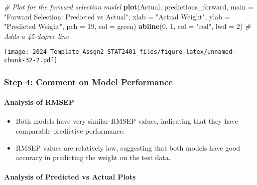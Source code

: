 \documentclass[
]{article}
\newenvironment{Shaded}{\begin{snugshade}}{\end{snugshade}}
\newcommand{\AttributeTok}[1]{\textcolor[rgb]{0.13,0.29,0.53}{#1}}
\newcommand{\CommentTok}[1]{\textcolor[rgb]{0.56,0.35,0.01}{\textit{#1}}}
\newcommand{\DecValTok}[1]{\textcolor[rgb]{0.00,0.00,0.81}{#1}}
\newcommand{\FunctionTok}[1]{\textcolor[rgb]{0.13,0.29,0.53}{\textbf{#1}}}
\newcommand{\NormalTok}[1]{#1}
\newcommand{\StringTok}[1]{\textcolor[rgb]{0.31,0.60,0.02}{#1}}
\providecommand{\tightlist}{%
  \setlength{\itemsep}{0pt}\setlength{\parskip}{0pt}}
\begin{document}
\begin{Shaded}
\begin{Highlighting}[]
\CommentTok{\# Plot for the forward selection model}
\FunctionTok{plot}\NormalTok{(Actual, predictions\_forward, }\AttributeTok{main =} \StringTok{"Forward Selection: Predicted vs Actual"}\NormalTok{,}
     \AttributeTok{xlab =} \StringTok{"Actual Weight"}\NormalTok{, }\AttributeTok{ylab =} \StringTok{"Predicted Weight"}\NormalTok{, }\AttributeTok{pch =} \DecValTok{19}\NormalTok{, }\AttributeTok{col =} \StringTok{\textquotesingle{}green\textquotesingle{}}\NormalTok{)}
\FunctionTok{abline}\NormalTok{(}\DecValTok{0}\NormalTok{, }\DecValTok{1}\NormalTok{, }\AttributeTok{col =} \StringTok{"red"}\NormalTok{, }\AttributeTok{lwd =} \DecValTok{2}\NormalTok{)  }\CommentTok{\# Adds a 45{-}degree line}
\end{Highlighting}
\end{Shaded}

\texttt{[image: 2024\_Template\_Assgn2\_STAT2401\_files/figure-latex/unnamed-chunk-32-2.pdf]}

\hypertarget{step-4-comment-on-model-performance}{%
\subsubsection{Step 4: Comment on Model
Performance}\label{step-4-comment-on-model-performance}}

\hypertarget{analysis-of-rmsep}{%
\paragraph{Analysis of RMSEP}\label{analysis-of-rmsep}}

\begin{itemize}
\tightlist
\item
  Both models have very similar RMSEP values, indicating that they have
  comparable predictive performance.
\item
  RMSEP values are relatively low, suggesting that both models have good
  accuracy in predicting the weight on the test data.
\end{itemize}

\hypertarget{analysis-of-predicted-vs-actual-plots}{%
\paragraph{Analysis of Predicted vs Actual
Plots}\label{analysis-of-predicted-vs-actual-plots}}
\end{document}
